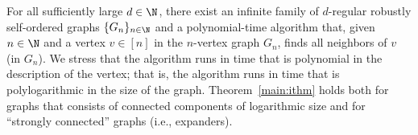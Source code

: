 \setcounter{theorem}{2}
\label{main:ithm}
For all sufficiently large $d\in\N$,
there exist an infinite family of $d$-regular
robustly self-ordered graphs $\{G_n\}_{n\in\N}$
and a polynomial-time algorithm that,
given $n\in\N$ and a vertex $v\in[n]$ in the $n$-vertex graph $G_n$,
finds all neighbors of $v$ {\rm(in $G_n$)}.
%
\ET
We stress that the algorithm runs in time that is polynomial
in the description of the vertex; that is, the algorithm runs
in time that is polylogarithmic in the size of the graph.
Theorem~\ref{main:ithm} holds both for graphs that consists
of connected components of logarithmic size
and for ``strongly connected'' graphs (i.e., expanders).

























































































